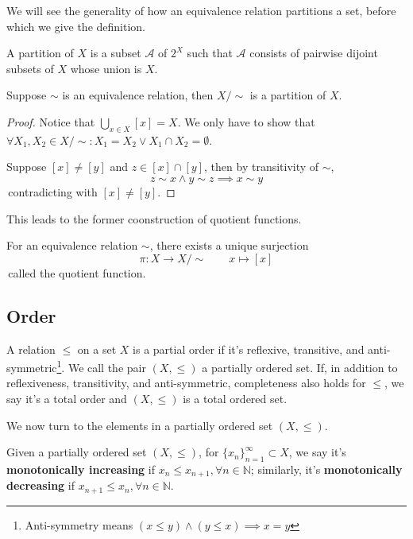 We will see the generality of how an equivalence relation partitions a set, before which we give the definition.
\begin{definition}[Partition]
    A partition of $X$ is a subset $\mathcal{A}$ of $2^{X}$ such that $\mathcal{A}$ consists of pairwise dijoint subsets of $X$ whose union is $X$.
\end{definition}

\begin{proposition}
    Suppose $\sim$ is an equivalence relation, then $X/\sim$ is a partition of $X$.
\end{proposition}
\begin{proof}
    Notice that $\bigcup_{x\in X} [x] = X$. We only have to show that $\forall X_1, X_2 \in X/\sim: X_1 = X_2 \lor X_1 \cap X_2 = \emptyset.$
    
    Suppose $[x] \neq [y]$ and $z \in [x] \cap [y]$, then by transitivity of $\sim$, $$z\sim x \land y\sim z \implies x \sim y$$
    \,contradicting with $[x] \neq [y]$.
\end{proof}

This leads to the former coonstruction of quotient functions.
\begin{theorem}
    For an equivalence relation $\sim$, there exists a unique surjection $$\pi: X \to X/\sim \qquad x \mapsto [x]$$
    \,called the quotient function. 
\end{theorem}


\subsection{Order}
A relation $\leq$ on a set $X$ is a partial order if it's reflexive, transitive, and anti-symmetric\footnote{Anti-symmetry means $(x \leq y) \land (y \leq x) \implies x = y$}.
We call the pair $(X,\leq)$ a partially ordered set. If, in addition to reflexiveness, transitivity, and anti-symmetric, completeness also holds for $\leq$, we say it's a total order and $(X,\leq)$ is a total ordered set.

We now turn to the elements in a partially ordered set $(X,\leq)$.

\begin{definition}[Monotonicity]
    Given a partially ordered set $(X,\leq)$, for $\{{x_n}\}_{n=1}^{\infty} \subset X$, we say it's \textbf{monotonically increasing} if $x_n \leq x_{n+1}, \forall n \in \mathbb{N}$; similarly, it's \textbf{monotonically decreasing} if $x_{n+1} \leq x_n, \forall n \in \mathbb{N}$.
\end{definition}

